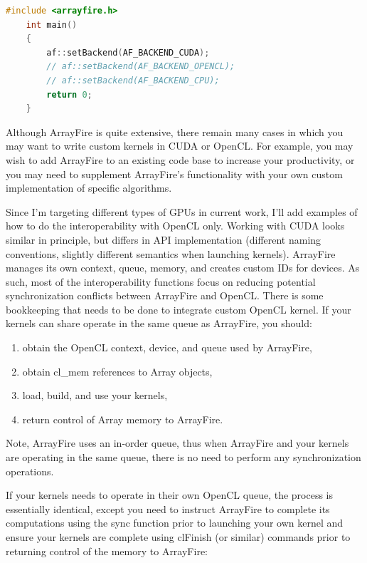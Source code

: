 \begin{lstlisting}[language=Cpp, caption=C++ code for setting different computing backends., label=cpp-backends]
	#include <arrayfire.h>
	int main()
	{
		af::setBackend(AF_BACKEND_CUDA);
		// af::setBackend(AF_BACKEND_OPENCL);
		// af::setBackend(AF_BACKEND_CPU);
		return 0;
	}
\end{lstlisting}

Although ArrayFire is quite extensive, there remain many cases in which you may want to write custom kernels in CUDA or OpenCL. For example, you may wish to add ArrayFire to an existing code base to increase your productivity, or you may need to supplement ArrayFire's functionality with your own custom implementation of specific algorithms.

Since I'm targeting different types of GPUs in current work, I'll add examples of how to do the interoperability with OpenCL only. Working with CUDA looks similar in principle, but differs in API implementation (different naming conventions, slightly different semantics when launching kernels).
ArrayFire manages its own context, queue, memory, and creates custom IDs for devices. As such, most of the interoperability functions focus on reducing potential synchronization conflicts between ArrayFire and OpenCL. There is some bookkeeping that needs to be done to integrate custom OpenCL kernel. If your kernels can share operate in the same queue as ArrayFire, you should:

\begin{enumerate}
\item obtain the OpenCL context, device, and queue used by ArrayFire,
\item obtain cl_mem references to Array objects,
\item load, build, and use your kernels,
\item return control of Array memory to ArrayFire.
\end{enumerate}

Note, ArrayFire uses an in-order queue, thus when ArrayFire and your kernels are operating in the same queue, there is no need to perform any synchronization operations.

If your kernels needs to operate in their own OpenCL queue, the process is essentially identical, except you need to instruct ArrayFire to complete its computations using the sync function prior to launching your own kernel and ensure your kernels are complete using clFinish (or similar) commands prior to returning control of the memory to ArrayFire:


